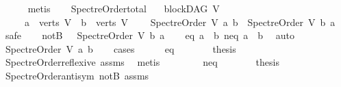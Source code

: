 \begin{isabellebody}
\ \ \ \ \isamarkupfalse%
\ {\isacharparenleft}{\kern0pt}metis{\isacharparenright}{\kern0pt}\isanewline
{}\isamarkupfalse%
%
\endisatagproof
{\isafoldproof}%
%
\isadelimproof
\ \ \isanewline
%
\endisadelimproof
\isanewline
{}\isamarkupfalse%
\ Spectre{\isacharunderscore}{\kern0pt}Order{\isacharunderscore}{\kern0pt}total{\isacharcolon}{\kern0pt}\isanewline
\ \ \ {\isachardoublequoteopen}blockDAG\ V{\isachardoublequoteclose}\isanewline
\ \ \ \ \ {\isachardoublequoteopen}a\ {\isasymin}\ verts\ V\ {\isasymand}\ b\ {\isasymin}\ verts\ V{\isachardoublequoteclose}\ \isanewline
\ \ \ {\isachardoublequoteopen}Spectre{\isacharunderscore}{\kern0pt}Order\ V\ a\ b\ {\isasymor}\ Spectre{\isacharunderscore}{\kern0pt}Order\ V\ b\ a{\isachardoublequoteclose}\isanewline
%
\isadelimproof
%
\endisadelimproof
%
\isatagproof
{}\isamarkupfalse%
\ safe\isanewline
\ \ \isamarkupfalse%
\ notB{\isacharcolon}{\kern0pt}\ {\isachardoublequoteopen}\ {\isasymnot}\ Spectre{\isacharunderscore}{\kern0pt}Order\ V\ b\ a{\isachardoublequoteclose}\isanewline
\ \ \isamarkupfalse%
\ {\isacharparenleft}{\kern0pt}eq{\isacharparenright}{\kern0pt}\ {\isachardoublequoteopen}a\ {\isacharequal}{\kern0pt}\ b{\isachardoublequoteclose}{\isacharbar}{\kern0pt}\ {\isacharparenleft}{\kern0pt}neq{\isacharparenright}{\kern0pt}\ {\isachardoublequoteopen}a\ {\isasymnoteq}\ b{\isachardoublequoteclose}\ \isamarkupfalse%
\ auto\isanewline
\ \ \isamarkupfalse%
\ \isamarkupfalse%
\ {\isachardoublequoteopen}Spectre{\isacharunderscore}{\kern0pt}Order\ V\ a\ b{\isachardoublequoteclose}\isanewline
\ \ \isamarkupfalse%
\ {\isacharparenleft}{\kern0pt}cases{\isacharparenright}{\kern0pt}\isanewline
\ \ \ \ \isamarkupfalse%
\ eq\isanewline
\ \ \ \ \isamarkupfalse%
\ \isamarkupfalse%
\ {\isacharquery}{\kern0pt}thesis\ \isamarkupfalse%
\ Spectre{\isacharunderscore}{\kern0pt}Order{\isacharunderscore}{\kern0pt}reflexive\ assms\ \isamarkupfalse%
\ metis\isanewline
\ \ \isamarkupfalse%
\isanewline
\ \ \ \ \isamarkupfalse%
\ neq\isanewline
\ \ \ \ \isamarkupfalse%
\ \isamarkupfalse%
\ {\isachardoublequoteopen}{\isacharquery}{\kern0pt}thesis{\isachardoublequoteclose}\ \isamarkupfalse%
\ Spectre{\isacharunderscore}{\kern0pt}Order{\isacharunderscore}{\kern0pt}antisym\ notB\ assms\isanewline

\end{isabellebody}
